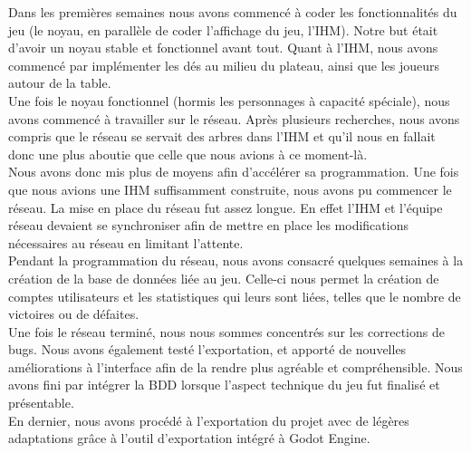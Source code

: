\documentclass[a4paper,11pt]{article}
\begin{document}
    Dans les premières semaines nous avons commencé à coder les fonctionnalités du jeu (le noyau, en parallèle de coder l’affichage du jeu, l’IHM). Notre but était d’avoir un noyau stable et fonctionnel avant tout. Quant à l’IHM, nous avons commencé par implémenter les dés au milieu du plateau, ainsi que les joueurs autour de la table. \\

	Une fois le noyau fonctionnel (hormis les personnages à capacité spéciale), nous avons commencé à travailler sur le réseau. Après plusieurs recherches, nous avons compris que le réseau se servait des arbres dans l’IHM et qu’il nous en fallait donc une plus aboutie que celle que nous avions à ce moment-là. \\

    Nous avons donc mis plus de moyens afin d’accélérer sa programmation. Une fois que nous avions une IHM suffisamment construite, nous avons pu commencer le réseau. La mise en place du réseau fut assez longue. En effet l’IHM et l’équipe réseau devaient se synchroniser afin de mettre en place les modifications nécessaires au réseau en limitant l’attente. \\

    Pendant la programmation du réseau, nous avons consacré quelques semaines à la création de la base de données liée au jeu. Celle-ci nous permet la création de comptes utilisateurs et les statistiques qui leurs sont liées, telles que le nombre de victoires ou de défaites. \\

	Une fois le réseau terminé, nous nous sommes concentrés sur les corrections de bugs. Nous avons également testé l’exportation, et apporté de nouvelles améliorations  à l’interface afin de la rendre plus agréable et compréhensible. Nous avons fini par intégrer la BDD lorsque l’aspect technique du jeu fut finalisé et présentable. \\ 

    En dernier, nous avons procédé à l’exportation du projet avec de légères adaptations grâce à l’outil d'exportation intégré à Godot Engine.
\end{document}
